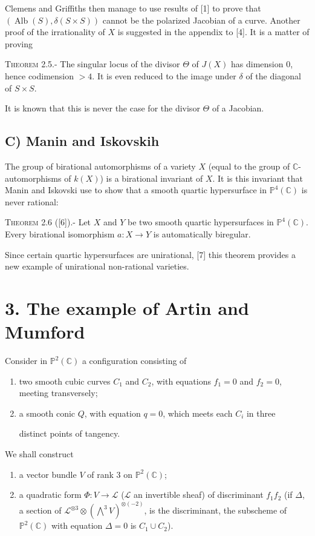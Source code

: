 \documentclass[10pt]{article}
\newcommand{\CC}{\mathbb C}
\newcommand{\PP}{\mathbb P}
\newcommand{\Alb}{\operatorname{Alb}}
\newcommand{\sourcehead}[1]{\par\medskip\noindent\textsc{#1}\quad}
\begin{document}
Clemens and Griffiths then manage to use results of [1] to prove that
\((\Alb(S),\delta(S\times S))\) cannot be the polarized Jacobian of a curve.
Another proof of the irrationality of \(X\) is suggested in the appendix to
[4]. It is a matter of proving

\sourcehead{Theorem 2.5.-} The singular locus of the divisor \(\Theta\) of
\(J(X)\) has dimension \(0\), hence codimension \(>4\). It is even reduced to
the image under \(\delta\) of the diagonal of \(S\times S\).

It is known that this is never the case for the divisor \(\Theta\) of a
Jacobian.

\subsection*{C) Manin and Iskovskih}

The group of birational automorphisms of a variety \(X\) (equal to the group of
\(\CC\)-automorphisms of \(k(X)\)) is a birational invariant of \(X\). It is
this invariant that Manin and Iskovski use to show that a smooth quartic
hypersurface in \(\PP^4(\CC)\) is never rational:

\sourcehead{Theorem 2.6 ([6]).-} Let \(X\) and \(Y\) be two smooth quartic
hypersurfaces in \(\PP^4(\CC)\). Every birational isomorphism
\(a:X\longrightarrow Y\) is automatically biregular.

Since certain quartic hypersurfaces are unirational, [7] this theorem provides
a new example of unirational non-rational varieties.

\section*{3. The example of Artin and Mumford}

Consider in \(\PP^2(\CC)\) a configuration consisting of
\begin{enumerate}[label=\alph*)]
\item two smooth cubic curves \(C_1\) and \(C_2\), with equations \(f_1=0\) and
\(f_2=0\), meeting transversely;
\item a smooth conic \(Q\), with equation \(q=0\), which meets each \(C_i\) in
three

distinct points of tangency.
\end{enumerate}

We shall construct
\begin{enumerate}[label=\alph*)]
\item a vector bundle \(V\) of rank \(3\) on \(\PP^2(\CC)\);
\item a quadratic form \(\Phi:V\to\mathcal L\) (\(\mathcal L\) an invertible
sheaf) of discriminant \(f_1f_2\) (if \(\Delta\), a section of
\(\mathcal L^{\otimes3}\otimes(\bigwedge^3V)^{\otimes(-2)}\), is the
discriminant, the subscheme of \(\PP^2(\CC)\) with equation \(\Delta=0\) is
\(C_1\cup C_2\)).
\end{enumerate}
\end{document}
